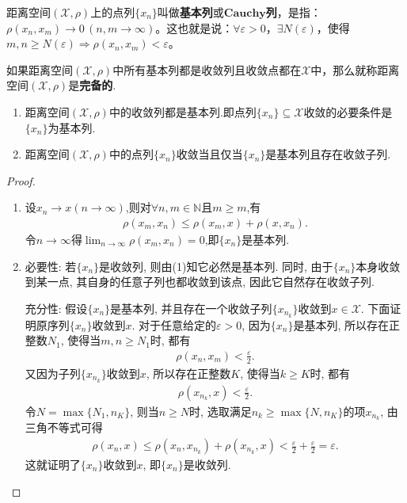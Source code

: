\documentclass[../../main.tex]{subfiles}%
\begin{document}
\begin{definition}
距离空间$(\mathscr{X},\rho)$上的点列$\{x_n\}$叫做\textbf{基本列}或$\mathbf{Cauchy}$\textbf{列}，是指：$\rho(x_n,x_m) \to 0\,(n,m \to \infty)$。这也就是说：$\forall \varepsilon > 0$，$\exists N(\varepsilon)$，使得$m,n \geqslant N(\varepsilon) \Rightarrow \rho(x_n,x_m) < \varepsilon$。

如果距离空间$(\mathscr{X},\rho)$中所有基本列都是收敛列且收敛点都在$\mathscr{X}$中，那么就称距离空间$(\mathscr{X},\rho)$是\textbf{完备的}.
\end{definition}

\begin{proposition}\label{proposition:收敛列必是基本列}
\begin{enumerate}[(1)]
\item  距离空间$(\mathscr{X},\rho)$中的收敛列都是基本列.即点列$\{x_n\}\subseteq \mathscr{X}$收敛的必要条件是$\{x_n\}$为基本列.

\item 距离空间$(\mathscr{X},\rho)$中的点列$\{x_n\}$收敛当且仅当$\{x_n\}$是基本列且存在收敛子列.
\end{enumerate}
\end{proposition}
\begin{proof}
\begin{enumerate}[(1)]
\item  设$x_n\to x(n\to \infty)$,则对$\forall n,m\in \mathbb{N}$且$m\geqslant m$,有
\begin{align*}
\rho(x_m,x_n)\leqslant \rho(x_m,x)+\rho (x,x_n).
\end{align*}
令$n\to \infty$得$\lim_{n\to \infty}\rho(x_m,x_n)=0$,即$\{x_n\}$是基本列.

\item {\heiti 必要性:} 若\(\{x_n\}\)是收敛列, 则由(1)知它必然是基本列. 同时, 由于\(\{x_n\}\)本身收敛到某一点, 其自身的任意子列也都收敛到该点, 因此它自然存在收敛子列.

{\heiti 充分性:} 假设\(\{x_n\}\)是基本列, 并且存在一个收敛子列\(\{x_{n_k}\}\)收敛到\(x \in \mathscr{X}\). 下面证明原序列\(\{x_n\}\)收敛到\(x\).
对于任意给定的\(\varepsilon > 0\), 因为\(\{x_n\}\)是基本列, 所以存在正整数\(N_1\), 使得当\(m,n \geqslant N_1\)时, 都有
\begin{align*}
\rho(x_n, x_m) < \frac{\varepsilon}{2}.
\end{align*}
又因为子列\(\{x_{n_k}\}\)收敛到\(x\), 所以存在正整数\(K\), 使得当\(k \geqslant K\)时, 都有
\begin{align*}
\rho(x_{n_k}, x) < \frac{\varepsilon}{2}.
\end{align*}
令\(N = \max\{N_1, n_K\}\), 则当\(n \geqslant N\)时, 选取满足\(n_k \geqslant \max\{N, n_K\}\)的项\(x_{n_k}\), 由三角不等式可得
\begin{align*}
\rho(x_n, x) \leqslant \rho(x_n, x_{n_k}) + \rho(x_{n_k}, x) < \frac{\varepsilon}{2} + \frac{\varepsilon}{2} = \varepsilon.
\end{align*}
这就证明了\(\{x_n\}\)收敛到\(x\), 即\(\{x_n\}\)是收敛列.
\end{enumerate}
\end{proof}
\end{document}
